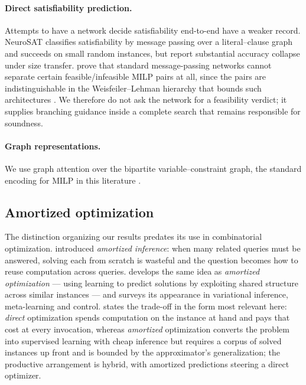 \documentclass[11pt]{article}
\begin{document}
\paragraph{Direct satisfiability prediction.} Attempts to have a network decide satisfiability end-to-end have a weaker record. NeuroSAT \citep{selsam2019neurosat} classifies satisfiability by message passing over a literal--clause graph and succeeds on small random instances, but \citet{li2023g4satbench} report substantial accuracy collapse under size transfer. \citet{chen2023representing} prove that standard message-passing networks cannot separate certain feasible/infeasible MILP pairs at all, since the pairs are indistinguishable in the Weisfeiler--Lehman hierarchy that bounds such architectures \citep{xu2019powerful}. We therefore do not ask the network for a feasibility verdict; it supplies branching guidance inside a complete search that remains responsible for soundness.

\paragraph{Graph representations.} We use graph attention \citep{velickovic2018graph} over the bipartite variable--constraint graph, the standard encoding for MILP in this literature \citep{gasse2019exact}.

\subsection{Amortized optimization}

The distinction organizing our results predates its use in combinatorial optimization. \citet{gershman2014amortized} introduced \emph{amortized inference}: when many related queries must be answered, solving each from scratch is wasteful and the question becomes how to reuse computation across queries. \citet{amos2023tutorial} develops the same idea as \emph{amortized optimization} --- using learning to predict solutions by exploiting shared structure across similar instances --- and surveys its appearance in variational inference, meta-learning and control. \citet{millidge2022deconfusing} states the trade-off in the form most relevant here: \emph{direct} optimization spends computation on the instance at hand and pays that cost at every invocation, whereas \emph{amortized} optimization converts the problem into supervised learning with cheap inference but requires a corpus of solved instances up front and is bounded by the approximator's generalization; the productive arrangement is hybrid, with amortized predictions steering a direct optimizer.
\end{document}
